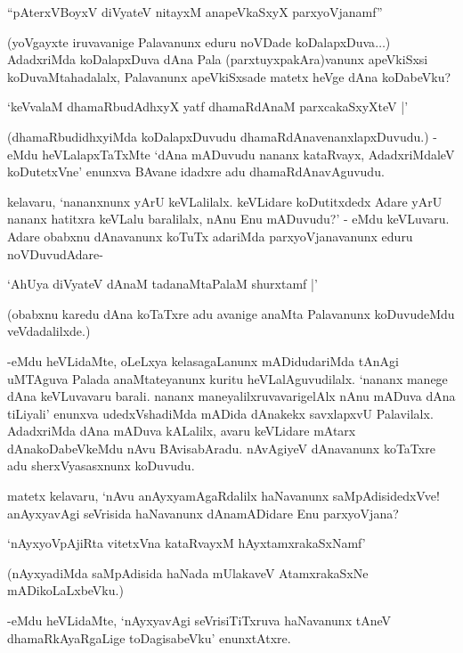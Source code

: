 \begin{shloka}
``pAterxVBoyxV diVyateV nitayxM anapeVkaSxyX parxyoVjanamf''
\end{shloka}

(yoVgayxte iruvavanige Palavanunx eduru noVDade koDalapxDuva$\ldots$) AdadxriMda koDalapxDuva dAna Pala (parxtuyxpakAra)vanunx apeVkiSxsi koDuvaMtahadalalx, Palavanunx apeVkiSxsade matetx heVge dAna koDabeVku?

\begin{shloka}
`keVvalaM dhamaRbudAdhxyX yatf dhamaRdAnaM parxcakaSxyXteV |'
\end{shloka}

(dhamaRbudidhxyiMda koDalapxDuvudu dhamaRdAnavenanxlapxDuvudu.) - eMdu heVLalapxTaTxMte `dAna mADuvudu nananx kataRvayx, AdadxriMdaleV koDutetxVne' enunxva BAvane idadxre adu dhamaRdAnavAguvudu.

kelavaru, `nananxnunx yArU keVLalilalx. keVLidare koDutitxdedx Adare yArU nananx hatitxra keVLalu baralilalx, nAnu Enu mADuvudu?' - eMdu keVLuvaru. Adare obabxnu dAnavanunx koTuTx adariMda parxyoVjanavanunx eduru noVDuvudAdare-

\begin{shloka}
`AhUya diVyateV dAnaM tadanaMtaPalaM shurxtamf |'
\end{shloka}

(obabxnu karedu dAna koTaTxre adu avanige anaMta Palavanunx koDuvudeMdu veVdadalilxde.)

-eMdu heVLidaMte, oLeLxya kelasagaLanunx mADidudariMda tAnAgi uMTAguva Palada anaMtateyanunx kuritu heVLalAguvudilalx. `nananx manege dAna keVLuvavaru barali. nananx maneyalilxruvavarigelAlx nAnu mADuva dAna tiLiyali' enunxva udedxVshadiMda mADida dAnakekx savxlapxvU Palavilalx. AdadxriMda dAna mADuva kALalilx, avaru keVLidare mAtarx dAnakoDabeVkeMdu nAvu BAvisabAradu. nAvAgiyeV dAnavanunx koTaTxre adu sherxVyasasxnunx koDuvudu.

matetx kelavaru, `nAvu anAyxyamAgaRdalilx haNavanunx saMpAdisidedxVve! anAyxyavAgi seVrisida haNavanunx dAnamADidare Enu parxyoVjana?

\begin{shloka}
`nAyxyoVpAjiRta vitetxVna kataRvayxM hAyxtamxrakaSxNamf'
\end{shloka}

(nAyxyadiMda saMpAdisida haNada mUlakaveV AtamxrakaSxNe mADikoLaLxbeVku.)

-eMdu heVLidaMte, `nAyxyavAgi seVrisiTiTxruva haNavanunx tAneV dhamaRkAyaRgaLige toDagisabeVku' enunxtAtxre.

